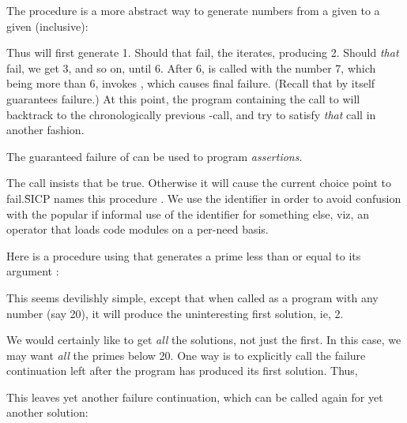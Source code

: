 The procedure  is
a more abstract way to generate numbers from a given 
to a given  (inclusive):


\n  Thus  will first
generate 1.  Should that fail, the  iterates,
producing 2.  Should {\em that} fail, we get 3, and
so on, until 6.  After 6,  is called with
the number 7, which being more than 6, invokes
, which causes final failure.   (Recall that
 by itself guarantees
failure.)  At this point, the program containing the
call to
 will backtrack to the
chronologically previous -call, and try to
satisfy {\em that} call in another fashion.

The guaranteed failure of  can be used to program
{\em assertions}.


\n The call  insists that  be
true.  Otherwise it will cause the current  choice
point to fail.\f{SICP names this procedure
.  We use the identifier  in order to
avoid confusion with the popular if informal use of
the identifier  for something else, viz, an
operator that loads code modules on a per-need basis.}

Here is a procedure using  that generates a prime
less than or equal to its argument :


\n This seems devilishly simple, except that when called as
a program with any number (say 20), it will produce the
uninteresting first solution, ie, 2.

We would certainly like to get {\em all} the solutions,
not just the first.  In this case, we may want {\em all}
the primes below
20.  One way is to explicitly call the failure
continuation left after the program has produced its first
solution.  Thus,


\n This leaves yet another failure continuation, which can
be called again for yet another solution:


